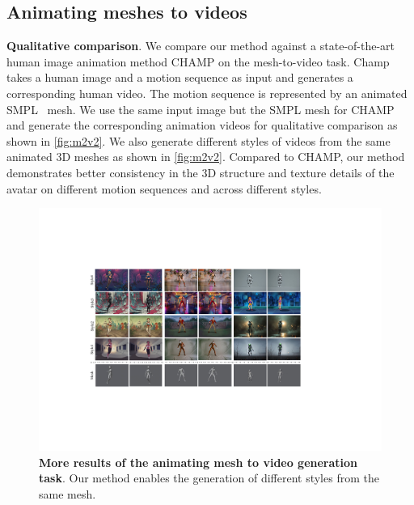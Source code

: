 \subsection{Animating meshes to videos}
\textbf{Qualitative comparison}. We compare our method against a state-of-the-art human image animation method CHAMP \cite{zhu2024champ} on the mesh-to-video task. 
Champ takes a human image and a motion sequence as input and generates a corresponding human video. The motion sequence is represented by an animated SMPL~\cite{loper2023smpl} mesh. We use the same input image but the SMPL mesh for CHAMP and generate the corresponding animation videos for qualitative comparison as shown in \autoref{fig:m2v2}. We also generate different styles of videos from the same animated 3D meshes as shown in \autoref{fig:m2v2}.
Compared to CHAMP, our method demonstrates better consistency in the 3D structure and texture details of the avatar on different motion sequences and across different styles. 

\begin{figure}
    \centering
    \includegraphics[width=\textwidth]{pictures/m2v1.pdf}
    \caption{\textbf{More results of the animating mesh to video generation task}. Our method enables the generation of different styles from the same mesh.}
    \label{fig:m2v1}
\end{figure}

